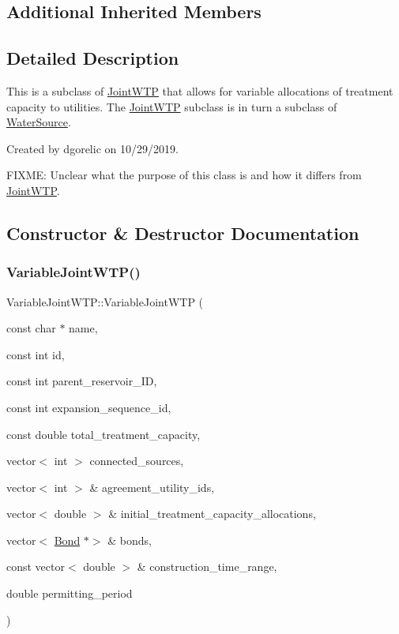 \subsection*{Additional Inherited Members}


\subsection{Detailed Description}
This is a subclass of \mbox{\hyperlink{classJointWTP}{Joint\+W\+TP}} that allows for variable allocations of treatment capacity to utilities. The \mbox{\hyperlink{classJointWTP}{Joint\+W\+TP}} subclass is in turn a subclass of \mbox{\hyperlink{classWaterSource}{Water\+Source}}. 

Created by dgorelic on 10/29/2019.

F\+I\+X\+ME\+: Unclear what the purpose of this class is and how it differs from \mbox{\hyperlink{classJointWTP}{Joint\+W\+TP}}. 

\subsection{Constructor \& Destructor Documentation}
\mbox{\label{classVariableJointWTP_a26fa2204e90fb7e44f17dbd2958a56fc}} 
\subsubsection{\texorpdfstring{Variable\+Joint\+W\+T\+P()}{VariableJointWTP()}\hspace{0.1cm}{\footnotesize\ttfamily [1/2]}}
{\footnotesize\ttfamily Variable\+Joint\+W\+T\+P\+::\+Variable\+Joint\+W\+TP (\begin{DoxyParamCaption}\item[{const char $\ast$}]{name,  }\item[{const int}]{id,  }\item[{const int}]{parent\+\_\+reservoir\+\_\+\+ID,  }\item[{const int}]{expansion\+\_\+sequence\+\_\+id,  }\item[{const double}]{total\+\_\+treatment\+\_\+capacity,  }\item[{vector$<$ int $>$}]{connected\+\_\+sources,  }\item[{vector$<$ int $>$ \&}]{agreement\+\_\+utility\+\_\+ids,  }\item[{vector$<$ double $>$ \&}]{initial\+\_\+treatment\+\_\+capacity\+\_\+allocations,  }\item[{vector$<$ \mbox{\hyperlink{classBond}{Bond}} $\ast$$>$ \&}]{bonds,  }\item[{const vector$<$ double $>$ \&}]{construction\+\_\+time\+\_\+range,  }\item[{double}]{permitting\+\_\+period }\end{DoxyParamCaption})}



